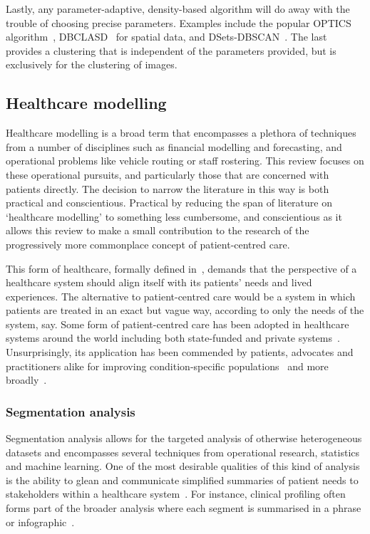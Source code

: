 Lastly, any parameter-adaptive, density-based algorithm will do away with the
trouble of choosing precise parameters. Examples include the popular OPTICS
algorithm~\cite{Ankerst1999}, DBCLASD~\cite{Xu1998} for spatial data, and
DSets-DBSCAN~\cite{Hou2016}. The last provides a clustering that is independent
of the parameters provided, but is exclusively for the clustering of images.


\subsection{Healthcare modelling}

Healthcare modelling is a broad term that encompasses a plethora of techniques
from a number of disciplines such as financial modelling and forecasting, and
operational problems like vehicle routing or staff rostering. This review
focuses on these operational pursuits, and particularly those that are concerned
with patients directly. The decision to narrow the literature in this way is
both practical and conscientious.
Practical by reducing the span of literature
on `healthcare modelling' to something less cumbersome, and conscientious as it
allows this review to make a small contribution to the research of the
progressively more commonplace concept of patient-centred care.

This form of healthcare, formally defined in~\cite{Robinson2008}, demands that
the perspective of a healthcare system should align itself with its patients'
needs and lived experiences. The alternative to patient-centred care would be a
system in which patients are treated in an exact but vague way, according to
only the needs of the system, say. Some form of patient-centred care has been
adopted in healthcare systems around the world including both state-funded and
private systems~\cite{DoH2010,Dewi2013,Luxford2011}. Unsurprisingly, its
application has been commended by patients, advocates and practitioners alike
for improving condition-specific
populations~\cite{Foster2019,Gambling2010,Gondek2016,Tsianakas2012} and more
broadly~\cite{IAPO2012,Richards2015,Santana2019}.

\subsubsection{Segmentation analysis}

Segmentation analysis allows for the targeted analysis of otherwise
heterogeneous datasets and encompasses several techniques from operational
research, statistics and machine learning. One of the most desirable qualities
of this kind of analysis is the ability to glean and communicate simplified
summaries of patient needs to stakeholders within a healthcare
system~\cite{Tomar2013,Vuik2016b,Yoon2020}. For instance, clinical profiling
often forms part of the broader analysis where each segment is summarised in a
phrase or infographic~\cite{Vuik2016a,Yan2019}.

